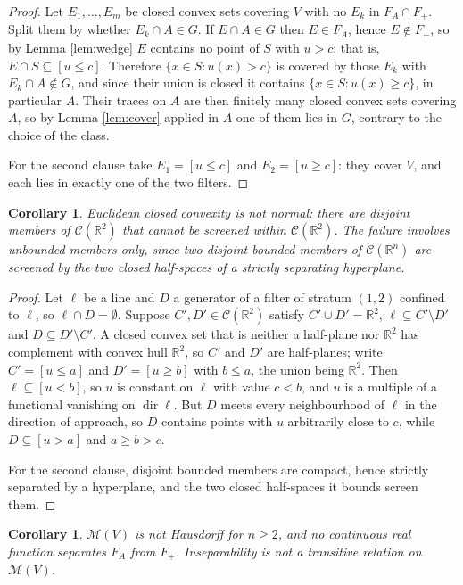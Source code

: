 \documentclass[11pt]{amsart}
\theoremstyle{plain}
\newtheorem{corollary}[theorem]{Corollary}
\theoremstyle{definition}
\DeclareMathOperator{\dir}{dir}
\newcommand{\CC}{\mathscr{C}}
\newcommand{\RR}{\mathbb{R}}
\begin{document}
\begin{proof}
Let $E_1,\dots,E_m$ be closed convex sets covering $V$ with no $E_k$ in $F_A\cap F_{+}$. Split them by whether $E_k\cap A\in G$. If $E\cap A\in G$ then $E\in F_A$, hence $E\notin F_{+}$, so by Lemma \ref{lem:wedge} $E$ contains no point of $S$ with $u>c$; that is, $E\cap S\subseteq[u\le c]$. Therefore $\{x\in S:u(x)>c\}$ is covered by those $E_k$ with $E_k\cap A\notin G$, and since their union is closed it contains $\{x\in S:u(x)\ge c\}$, in particular $A$. Their traces on $A$ are then finitely many closed convex sets covering $A$, so by Lemma \ref{lem:cover} applied in $A$ one of them lies in $G$, contrary to the choice of the class.

For the second clause take $E_1=[u\le c]$ and $E_2=[u\ge c]$: they cover $V$, and each lies in exactly one of the two filters.
\end{proof}

\begin{corollary}\label{cor:notnormal}
Euclidean closed convexity is not normal: there are disjoint members of $\CC(\RR^2)$ that cannot be screened within $\CC(\RR^2)$. The failure involves unbounded members only, since two disjoint bounded members of $\CC(\RR^n)$ are screened by the two closed half-spaces of a strictly separating hyperplane.
\end{corollary}

\begin{proof}
Let $\ell$ be a line and $D$ a generator of a filter of stratum $(1,2)$ confined to $\ell$, so $\ell\cap D=\emptyset$. Suppose $C',D'\in\CC(\RR^2)$ satisfy $C'\cup D'=\RR^2$, $\ell\subseteq C'\setminus D'$ and $D\subseteq D'\setminus C'$. A closed convex set that is neither a half-plane nor $\RR^2$ has complement with convex hull $\RR^2$, so $C'$ and $D'$ are half-planes; write $C'=[u\le a]$ and $D'=[u\ge b]$ with $b\le a$, the union being $\RR^2$. Then $\ell\subseteq[u<b]$, so $u$ is constant on $\ell$ with value $c<b$, and $u$ is a multiple of a functional vanishing on $\dir\ell$. But $D$ meets every neighbourhood of $\ell$ in the direction of approach, so $D$ contains points with $u$ arbitrarily close to $c$, while $D\subseteq[u>a]$ and $a\ge b>c$.

For the second clause, disjoint bounded members are compact, hence strictly separated by a hyperplane, and the two closed half-spaces it bounds screen them.
\end{proof}

\begin{corollary}\label{cor:nothausdorff}
$\mathcal{M}(V)$ is not Hausdorff for $n\ge2$, and no continuous real function separates $F_A$ from $F_{+}$. Inseparability is not a transitive relation on $\mathcal{M}(V)$.
\end{corollary}
\end{document}
